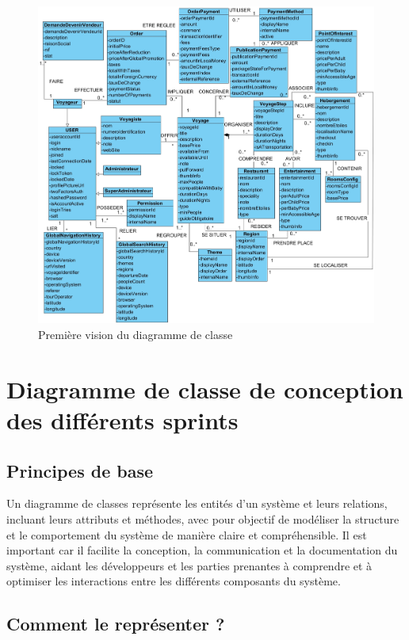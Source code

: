 \documentclass[12pt]{report}
\begin{document}
			\begin{figure}[h]
				\centering
				\includegraphics[width=\textwidth]{generalDC.jpg}
				\caption{Première vision du diagramme de classe}
				\label{fig:DCGlobal}
			\end{figure}
			\clearpage


			\section{Diagramme de classe de conception des différents sprints}
				\subsection{Principes de base}
				
				\hspace{15pt} Un diagramme de classes représente les entités d'un système et leurs relations, incluant leurs attributs et méthodes, avec pour objectif de modéliser la structure et le comportement du système de manière claire et compréhensible. Il est important car il facilite la conception, la communication et la documentation du système, aidant les développeurs et les parties prenantes à comprendre et à optimiser les interactions entre les différents composants du système.
				
				\subsection{Comment le représenter ?}
				
\end{document}

